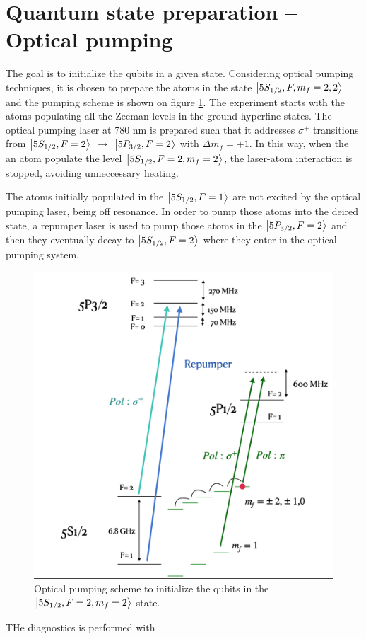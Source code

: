 \documentclass[
10pt, %
a4paper, %
oneside, %
headinclude,footinclude, %
BCOR5mm, %
]{scrartcl}
\begin{document}
\clearpage
\newpage

\section{Quantum state preparation -- Optical pumping}

The goal is to initialize the qubits in a given state. Considering optical pumping techniques, it is chosen to prepare the atoms in the state $\ket{5S_{1/2}, F,m_{f} = 2,2}$ and the pumping scheme is shown on figure \ref{OpticalPumping}. The experiment starts with the atoms populating all the Zeeman levels in the ground hyperfine states. The optical pumping laser at 780 nm is prepared such that it addresses $\sigma^{+}$ transitions from $\ket{5S_{1/2}, F=2}$ $\rightarrow$ $\ket{5P_{3/2}, F=2}$ with $\Delta m_{f} = +1$. In this way, when the an atom populate the level $\ket{5S_{1/2}, F=2, m_{f}=2}$, the laser-atom interaction is stopped, avoiding unneccessary heating. 

The atoms initially populated in the $\ket{5S_{1/2}, F=1}$ are not excited by the optical pumping laser, being off resonance. In order to pump those atoms into the deired state, a repumper laser is used to pump those atoms in the $\ket{5P_{3/2}, F=2}$ and then they eventually decay to $\ket{5S_{1/2}, F=2}$ where they enter in the optical pumping system. 

\begin{figure}[t]
    \includegraphics[width=0.8\linewidth]{OpticalPumpingScheme}
    \centering
    \caption{Optical pumping scheme to initialize the qubits in the $\ket{5S_{1/2}, F=2, m_{f}=2}$ state.}
    \label{OpticalPumping}
\end{figure}

THe diagnostics is performed with 
\end{document}

